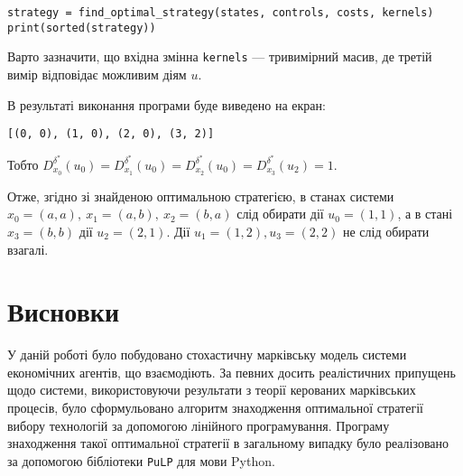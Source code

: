 \documentclass[oneside,14pt]{extarticle}
\begin{document}
\begin{example}
\begin{lstlisting}
strategy = find_optimal_strategy(states, controls, costs, kernels)
print(sorted(strategy))
\end{lstlisting}

Варто зазначити, що вхідна змінна \texttt{kernels} — тривимірний масив, де третій вимір відповідає можливим діям \(u\).

В результаті виконання програми буде виведено на екран:
\begin{lstlisting}
[(0, 0), (1, 0), (2, 0), (3, 2)]
\end{lstlisting}
Тобто \(D_{x_0}^{\delta^{*}}(u_0) = D_{x_1}^{\delta^*}(u_0) = D_{x_2}^{\delta^*}(u_0) = D_{x_3}^{\delta^*}(u_2) = 1 \).

Отже, згідно зі знайденою оптимальною стратегією, в станах системи \(x_0 = (a, a),\ x_1 = (a, b),\ x_2 = (b, a)\) слід обирати дії \(u_0 = (1, 1)\), а в стані \(x_3 = (b, b)\) дії \(u_2 = (2, 1)\). Дії \(u_1 = (1, 2	), u_3 = (2, 2)\) не слід обирати взагалі. \end{example}

\clearpage
\section{Висновки}
У даній роботі було побудовано стохастичну марківську модель системи економічних агентів, що взаємодіють. За певних досить реалістичних припущень щодо системи, використовуючи результати з теорії керованих марківських процесів, було сформульовано алгоритм знаходження оптимальної стратегії вибору технологій за допомогою лінійного програмування. Програму знаходження такої оптимальної стратегії в загальному випадку було реалізовано за допомогою бібліотеки \texttt{PuLP} для мови Python.

\clearpage


\nocite{David:1998}
\nocite{Knopov:2011}
\nocite{Knopov:1998}
\nocite{Chornei:2005}
\nocite{Koller:2009}

\renewcommand\bibname{Посилання}


\end{document}
